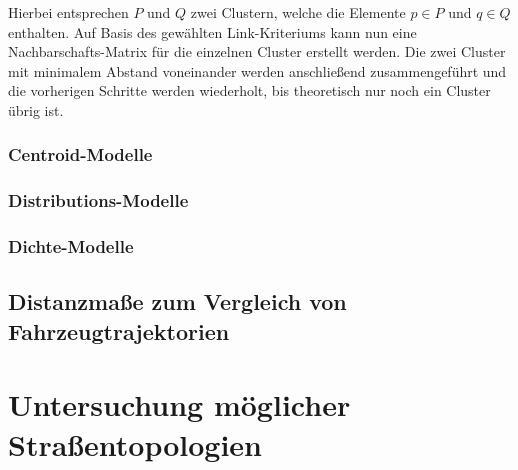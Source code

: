 Hierbei entsprechen $P$ und $Q$ zwei Clustern, welche die Elemente $p \in P$ und $q \in Q$ enthalten.
Auf Basis des gewählten Link-Kriteriums kann nun eine Nachbarschafts-Matrix für die einzelnen Cluster
erstellt werden.
Die zwei Cluster mit minimalem Abstand voneinander werden anschließend zusammengeführt und die
vorherigen Schritte werden wiederholt, bis theoretisch nur noch ein Cluster übrig ist.

\subsubsection{Centroid-Modelle}

\subsubsection{Distributions-Modelle}

\subsubsection{Dichte-Modelle}

\subsection{Distanzmaße zum Vergleich von Fahrzeugtrajektorien}
\label{sec:distance_measures}

\section{Untersuchung möglicher Straßentopologien}
\label{sec:street_topologies}